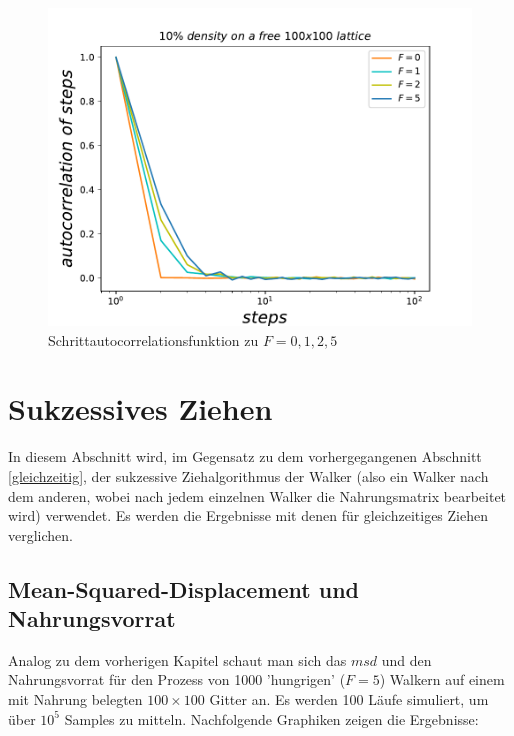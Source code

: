 \documentclass[a4paper, 12pt]{report}
\begin{document}
\begin{figure}[H]
	\centering
	\includegraphics[scale=0.7]{stepautocorr_multF.pdf}
	\caption{Schrittautocorrelationsfunktion zu $F=0,1,2,5$}
\end{figure}

\clearpage

\section{Sukzessives Ziehen}
In diesem Abschnitt wird, im Gegensatz zu dem vorhergegangenen Abschnitt \ref{gleichzeitig}, der sukzessive Ziehalgorithmus der Walker (also ein Walker nach dem anderen, wobei nach jedem einzelnen Walker die Nahrungsmatrix bearbeitet wird) verwendet. Es werden die Ergebnisse mit denen für gleichzeitiges Ziehen verglichen.

\subsection{Mean-Squared-Displacement und Nahrungsvorrat}
Analog zu dem vorherigen Kapitel schaut man sich das $msd$ und den Nahrungsvorrat für den Prozess von 1000 'hungrigen' ($F=5$) Walkern auf einem mit Nahrung belegten $100\times 100$ Gitter an. Es werden 100 Läufe simuliert, um über $10^5$ Samples zu mitteln. Nachfolgende Graphiken zeigen die Ergebnisse: 
\end{document}
